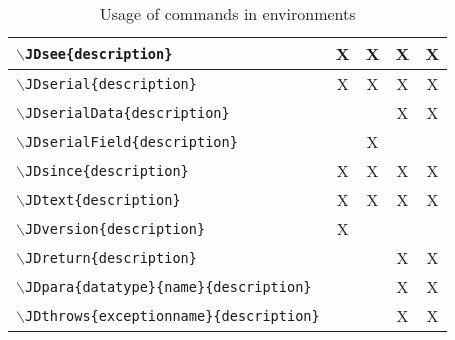 \documentclass[11pt,a4paper]{article}
\newcommand{\code}[1]{\protect\texttt{#1}}
\newcommand{\befehl}[1]{\code{$\backslash$#1}}
\begin{document}
\begin{table}[!ht]
\begin{center}
\begin{tabular}{l|c|c|c|c }
		 \befehl{JDsee\{description\}}	& X & X & X & X
		\\ \hline
		 \befehl{JDserial\{description\}}	& X & X & X & X
		\\ \hline
		 \befehl{JDserialData\{description\}}	&  &  & X & X
		\\ \hline
		 \befehl{JDserialField\{description\}}	&  & X &  & 
		\\ \hline
		 \befehl{JDsince\{description\}}	& X & X & X & X
		\\ \hline
		 \befehl{JDtext\{description\}}	& X & X & X & X
		\\ \hline
		 \befehl{JDversion\{description\}}	& X & &  & 
		\\ \hline
		 \befehl{JDreturn\{description\}}	&  &  & X & X
		\\ \hline
		 \befehl{JDpara\{datatype\}\{name\}\{description\}} 	& & & X & X
		\\ \hline
		 \befehl{JDthrows\{exceptionname\}\{description\}} &  &  & X & X
	\end{tabular}
	\caption{Usage of commands in environments}
	\label{tab:befehleInUmgebung}
	\end{center}
\end{table}
\end{document}
